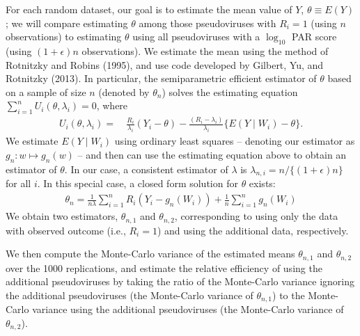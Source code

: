 \documentclass[10pt]{article}
\begin{document}
For each random dataset, our goal is to estimate the mean value of $Y$, $\theta \equiv E(Y)$; we will compare estimating $\theta$ among those pseudoviruses with $R_i = 1$ (using $n$ observations) to estimating $\theta$ using all pseudoviruses with a $\log_{10}$ PAR score (using $(1+\epsilon)n$ observations). We estimate the mean using the method of Rotnitzky and Robins (1995), and use code developed by Gilbert, Yu, and Rotnitzky (2013). In particular, the semiparametric efficient estimator of $\theta$ based on a sample of size $n$ (denoted by $\theta_n$) solves the estimating equation $\sum_{i=1}^n U_i(\theta, \lambda_i) = 0$, where
\begin{align*}
    U_i(\theta, \lambda_i) =& \ \frac{R_i}{\lambda_i}(Y_i - \theta) - \frac{(R_i - \lambda_i)}{\lambda_i}\{E(Y \mid W_i) - \theta\}.
\end{align*}
We estimate $E(Y \mid W_i)$ using ordinary least squares -- denoting our estimator as $g_n: w \mapsto g_n(w)$ -- and then can use the estimating equation above to obtain an estimator of $\theta$. In our case, a consistent estimator of $\lambda$ is $\lambda_{n,i} = n / \{(1 + \epsilon)n\}$ for all $i$. In this special case, a closed form solution for $\theta$ exists:
\begin{align*}
    \theta_n = \frac{1}{n\lambda}\sum_{i=1}^nR_i(Y_i - g_n(W_i)) + \frac{1}{n}\sum_{i=1}^n g_n(W_i)
\end{align*}
 We obtain two estimators, $\theta_{n,1}$ and $\theta_{n,2}$, corresponding to using only the data with observed outcome (i.e., $R_i = 1$) and using the additional data, respectively.

We then compute the Monte-Carlo variance of the estimated means $\theta_{n,1}$ and $\theta_{n,2}$ over the 1000 replications, and estimate the relative efficiency of using the additional pseudoviruses by taking the ratio of the Monte-Carlo variance ignoring the additional pseudoviruses (the Monte-Carlo variance of $\theta_{n,1}$) to the Monte-Carlo variance using the additional pseudoviruses (the Monte-Carlo variance of $\theta_{n,2}$).
\end{document}
